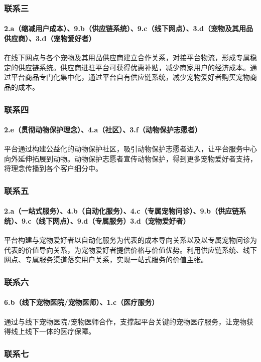 \documentclass[a4paper]{ctexart}
\begin{document}
\subsubsection{联系三}
\paragraph{2.a（缩减用户成本）、9.b（供应链系统）、9.c（线下网点）、3.d（宠物及其用品供应商）、3.d（宠物爱好者）}在线下网点与各个宠物及其用品供应商建立合作关系，对接平台物流，形成专属稳定的供应链系统。供应商进驻平台可获得优惠补贴，减少商家用户的经济成本。通过平台商品专门化集中化，通过平台自有供应链系统，减少宠物爱好者购买宠物商品的成本。
\subsubsection{联系四}
\paragraph{2.e（贯彻动物保护理念）、4.a（社区）、3.f（动物保护志愿者）}平台通过构建公益化的动物保护社区，吸引动物保护志愿者进入，让平台服务中心向外延伸拓展到动物。动物保护志愿者宣传动物保护，得到更多宠物爱好者支持，将理念传播到各个客户细分中。
\subsubsection{联系五}
\paragraph{2.a（一站式服务）、4.b（自动化服务）、4.c（专属宠物问诊）、9.b（供应链系统）、9.c（线下网点）、9.d（专属服务）3.d（宠物爱好者）}平台构建与宠物爱好者以自动化服务为代表的成本导向关系以及以专属宠物问诊为代表的价值导向关系，为宠物爱好者提供价格与价值优势。利用供应链系统、线下网点、专属服务渠道落实用户关系，实现一站式服务的价值主张。
\subsubsection{联系六}
\paragraph{6.b（线下宠物医院/宠物医师）、1.c（医疗服务）}通过与线下宠物医院/宠物医师合作，支撑起平台关键的宠物医疗服务，让宠物获得线上线下一体的医疗保障。
\subsubsection{联系七}
\end{document}
